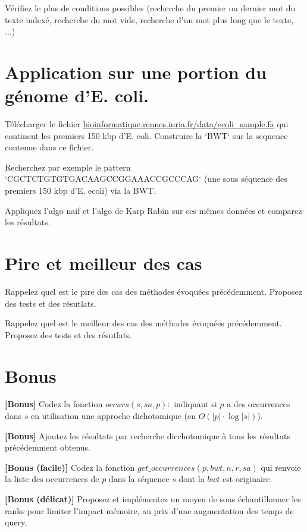 \qu{} Vérifiez le plus de conditions possibles (recherche du premier ou dernier mot du texte indexé, recherche du mot vide, recherche d'un mot plus long que le texte, ...)

\section*{Application sur une portion du génome d'E. coli.}
 Télécharger le fichier \url{bioinformatique.rennes.inria.fr/data/ecoli_sample.fa} qui continent les premiers 150 kbp d'E. coli.
 Construire la `BWT` sur la sequence contenue dans ce fichier.

\qu{} Recherchez par exemple le pattern `CGCTCTGTGTGACAAGCCGGAAACCGCCCAG` (une sous séquence des premiers 150 kbp d'E. ecoli) via la BWT. 

\qu{} Appliquez l'algo naif et l'algo de Karp Rabin  sur ces mêmes données et comparez les résultats. 

\section*{Pire et meilleur des cas}

\qu{} Rappelez quel est le pire des cas des méthodes évoquées précédemment. Proposez des tests et des résutlats.

\qu{} Rappelez quel est le meilleur des cas des méthodes évoquées précédemment. Proposez des tests et des résutlats.


\section*{Bonus}
\qu{}\textbf{[Bonus]} Codez la fonction $occurs(s, sa, p):$ indiquant si $p$ a des occurrences dans $s$ en utilisation une approche dichotomique (en $O(|p|\cdot \log|s|)$).

\qu{}\textbf{[Bonus]} Ajoutez les résultats par recherche dicchotomique à tous les résultats précédemment obtenus. 

\qu{}\textbf{[Bonus (facile)]} Codez la fonction $get\_occurrences(p, bwt, n, r, sa)$ qui renvoie la liste des occurrences de $p$ dans la séquence $s$ dont la $bwt$ est originaire.

\qu{}\textbf{[Bonus (délicat)]} Proposez et implémentez un moyen de sous échantillonner les ranks pour limiter l'impact mémoire, au prix d'une augmentation des temps de query.





